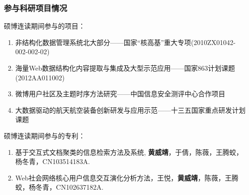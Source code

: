 \begin{transparentFootline}
\begin{frame}
\frametitle{\noindent 参与科研项目情况}

硕博连读期间参与的项目：
\footnotesize
\begin{enumerate}
\item 非结构化数据管理系统北大部分——国家“核高基”重大专项(2010ZX01042-002-002-02)
\item 海量Web数据结构化内容提取与集成及大型示范应用——国家863计划课题(2012AA011002)
\item 微博用户社区及主题时序方法研究——中国信息安全测评中心合作项目
\item 大数据驱动的航天航空装备创新研发与应用示范——十三五国家重点研发计划课题
\end{enumerate}

\vfill

\normalsize
硕博连读期间参与的专利：
\footnotesize
\begin{enumerate}
\item 基于交互式文档聚类的信息检索方法及系统, \textbf{黄威靖}，于倩，陈薇，王腾蛟，杨冬青，CN103514183A.
\item Web社会网络核心用户信息交互演化分析方法，王悦，\textbf{黄威靖}，陈薇，王腾蛟，杨冬青，CN102637182A.
\end{enumerate}

\end{frame}
\end{transparentFootline}


